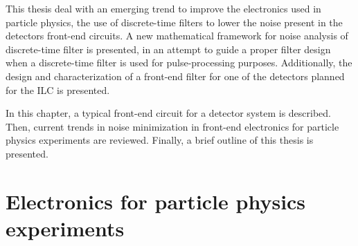 This thesis deal with an emerging trend to improve the electronics used in particle physics, the use of discrete-time filters to lower the noise present in the detectors front-end circuits. A new mathematical framework for noise analysis of discrete-time filter is presented, in an attempt to guide a proper filter design when a discrete-time filter is used for pulse-processing purposes. Additionally, the design and characterization of a front-end filter for one of the detectors planned for the ILC is presented.






 






In this chapter, a typical front-end circuit for a detector system is described. Then, current trends in noise minimization in front-end electronics for particle physics experiments are reviewed. Finally, a brief outline of this thesis is presented.

\section{Electronics for particle physics experiments}


